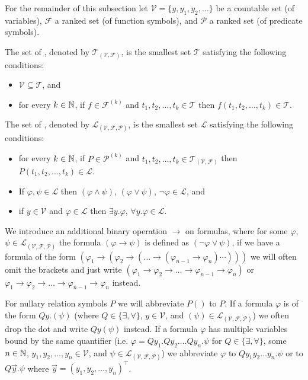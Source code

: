 For the remainder of this subsection let $\mathcal{V}=\{y,y_1,y_2,\dots\}$ be a countable set (of variables), $\mathcal{F}$ a ranked set (of function symbols), and $\mathcal{P}$ a ranked set (of predicate symbols).
\begin{definition}
	The set of , denoted by $\mathcal{T}_{(\mathcal{V},\mathcal{F})}$, is the smallest set $\mathcal{T}$ satisfying the following conditions:
	\begin{itemize}
		\item $\mathcal{V} \subseteq \mathcal{T}$, and
		\item for every $k\in\mathbb{N}$, if $f\in\mathcal{F}^{(k)}$ and $t_1,t_2,\dots,t_k\in\mathcal{T}$ then $f(t_1,t_2,\dots,t_k)\in\mathcal{T}$.
	\end{itemize}
	The set of , denoted by $\mathcal{L}_{(\mathcal{V},\mathcal{F},\mathcal{P})}$, is the smallest set $\mathcal{L}$ satisfying the following conditions:
	\begin{itemize}
		\item for every $k\in\mathbb{N}$, if $P\in\mathcal{P}^{(k)}$ and $t_1,t_2,\dots,t_k\in\mathcal{T}_{(\mathcal{V},\mathcal{F})}$ then $P(t_1,t_2,\dots,t_k)\in\mathcal{L}$.
		\item If $\varphi,\psi\in\mathcal{L}$ then $(\varphi\wedge\psi)$, $(\varphi\vee\psi)$, $\neg \varphi\in\mathcal{L}$, and
		\item if $y\in\mathcal{V}$ and $\varphi\in\mathcal{L}$ then $\exists y.\varphi$, $\forall y.\varphi\in\mathcal{L}$.
	\end{itemize}
\end{definition}
We introduce an additional binary operation $\to$ on formulas, where for some $\varphi$, $\psi\in\mathcal{L}_{(\mathcal{V},\mathcal{F},\mathcal{P})}$ the formula $(\varphi\to\psi)$ is defined as $(\neg\varphi\vee\psi)$, if we have a formula of the form $(\varphi_1\to(\varphi_2\to(\dots \to(\varphi_{n-1}\to \varphi_n)\cdots)))$ we will often omit the brackets and just write $(\varphi_1\to \varphi_2\to\dots\to \varphi_{n-1}\to \varphi_n)$ or $\varphi_1\to \varphi_2\to\dots \to \varphi_{n-1}\to \varphi_n$ instead. 

For nullary relation symbols $P$ we will abbreviate $P()$ to $P$. If a formula $\varphi$ is of the form $Qy.(\psi)$ (where $Q\in\{\exists,\forall\}$, $y\in\mathcal{V}$, and $(\psi)\in\mathcal{L}_{(\mathcal{V},\mathcal{F},\mathcal{P})}$) we often drop the dot and write $Qy(\psi)$ instead. %
If a formula $\varphi$ has multiple variables bound by the same quantifier (i.e. $\varphi=Qy_1.Qy_2.\dots Qy_n.\psi$ for $Q\in\{\exists,\forall\}$, some $n\in\mathbb{N}$, $y_1,y_2,\dots,y_n\in\mathcal{V}$, and $\psi\in\mathcal{L}_{(\mathcal{V},\mathcal{F},\mathcal{P})}$) we abbreviate $\varphi$ to $Qy_1y_2\dots y_n.\psi$ or to $Q\vec{y}.\psi$ where $\vec{y}=(y_1,y_2,\dots,y_n)^\top$. %

